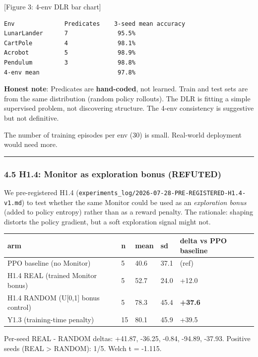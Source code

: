 \documentclass[
]{article}
\newcounter{none} %
\begin{document}
{[}Figure 3: 4-env DLR bar chart{]}

\begin{verbatim}
Env              Predicates    3-seed mean accuracy
LunarLander      7              95.5%
CartPole         4              98.1%
Acrobot          5              98.9%
Pendulum         3              98.8%
4-env mean                      97.8%
\end{verbatim}

\textbf{Honest note}: Predicates are \textbf{hand-coded}, not learned.
Train and test sets are from the same distribution (random policy
rollouts). The DLR is fitting a simple supervised problem, not
discovering structure. The 4-env consistency is suggestive but not
definitive.

The number of training episodes per env (30) is small. Real-world
deployment would need more.

\begin{center}\rule{0.5\linewidth}{0.5pt}\end{center}

\subsubsection{4.5 H1.4: Monitor as exploration bonus
(REFUTED)}\label{h1.4-monitor-as-exploration-bonus-refuted}

We pre-registered H1.4
(\texttt{experiments\_log/2026-07-28-PRE-REGISTERED-H1.4-v1.md}) to test
whether the same Monitor could be used as an \emph{exploration bonus}
(added to policy entropy) rather than as a reward penalty. The
rationale: shaping distorts the policy gradient, but a soft exploration
signal might not.

{\def\LTcaptype{none} %
\begin{longtable}[]{@{}lllll@{}}
\toprule\noalign{}
arm & n & mean & sd & delta vs PPO baseline \\
\midrule\noalign{}
\endhead
\bottomrule\noalign{}
\endlastfoot
PPO baseline (no Monitor) & 5 & 40.6 & 37.1 & (ref) \\
H1.4 REAL (trained Monitor bonus) & 5 & 52.7 & 24.0 & +12.0 \\
H1.4 RANDOM (U{[}0,1{]} bonus control) & 5 & 78.3 & 45.4 &
\textbf{+37.6} \\
Y1.3 (training-time penalty) & 15 & 80.1 & 45.9 & +39.5 \\
\end{longtable}
}

Per-seed REAL - RANDOM deltas: +41.87, -36.25, -0.84, -94.89, -37.93.
Positive seeds (REAL \textgreater{} RANDOM): 1/5. Welch t = -1.115.
\end{document}
